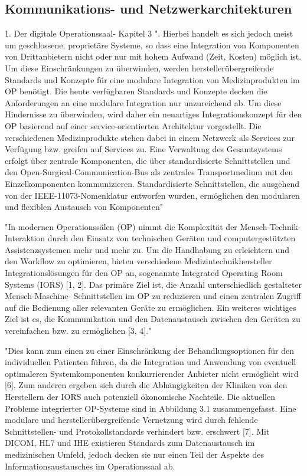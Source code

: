 \subsection{Kommunikations- und Netzwerkarchitekturen}
1. Der digitale Operationssaal- Kapitel 3
	". Hierbei handelt es sich jedoch meist um geschlossene,
	proprietäre Systeme, so dass eine Integration von Komponenten von Drittanbietern
	nicht oder nur mit hohem Aufwand (Zeit, Kosten) möglich ist. Um diese Einschränkungen
	zu überwinden, werden herstellerübergreifende Standards und Konzepte für
	eine modulare Integration von Medizinprodukten im OP benötigt. Die heute verfügbaren
	Standards und Konzepte decken die Anforderungen an eine modulare Integration
	nur unzureichend ab. Um diese Hindernisse zu überwinden, wird daher ein
	neuartiges Integrationskonzept für den OP basierend auf einer service-orientierten
	Architektur vorgestellt.
	Die verschiedenen Medizinprodukte stehen dabei in einem Netzwerk als Services
	zur Verfügung bzw. greifen auf Services zu. Eine Verwaltung des Gesamtsystems
	erfolgt über zentrale Komponenten, die über standardisierte Schnittstellen und den
	Open-Surgical-Communication-Bus als zentrales Transportmedium mit den Einzelkomponenten
	kommunizieren. Standardisierte Schnittstellen, die ausgehend von der
	IEEE-11073-Nomenklatur entworfen wurden, ermöglichen den modularen und flexiblen
	Austausch von Komponenten"
	
	"In modernen Operationssälen (OP) nimmt die Komplexität der Mensch-Technik-
	Interaktion durch den Einsatz von technischen Geräten und computergestützten
	Assistenzsystemen mehr und mehr zu. Um die Handhabung zu erleichtern und den
	Workflow zu optimieren, bieten verschiedene Medizintechnikhersteller Integrationslösungen
	für den OP an, sogenannte Integrated Operating Room Systems (IORS)
	[1, 2]. Das primäre Ziel ist, die Anzahl unterschiedlich gestalteter Mensch-Maschine-
	Schnittstellen im OP zu reduzieren und einen zentralen Zugriff auf die Bedienung
	aller relevanten Geräte zu ermöglichen.
	Ein weiteres wichtiges Ziel ist es, die Kommunikation und den Datenaustausch
	zwischen den Geräten zu vereinfachen bzw. zu ermöglichen [3, 4]."
	
	"Dies kann zum einen zu einer Einschränkung der Behandlungsoptionen für den
	individuellen Patienten führen, da die Integration und Anwendung von eventuell
	optimaleren Systemkomponenten konkurrierender Anbieter nicht ermöglicht wird
	[6]. Zum anderen ergeben sich durch die Abhängigkeiten der Kliniken von den Herstellern
	der IORS auch potenziell ökonomische Nachteile. Die aktuellen Probleme
	integrierter OP-Systeme sind in Abbildung 3.1 zusammengefasst.
	Eine modulare und herstellerübergreifende Vernetzung wird durch fehlende
	Schnittstellen- und Protokollstandards verhindert bzw. erschwert [7]. Mit DICOM, HL7
	und IHE existieren Standards zum Datenaustausch im medizinischen Umfeld, jedoch
	decken sie nur einen Teil der Aspekte des Informationsaustausches im Operationssaal
	ab.
	
